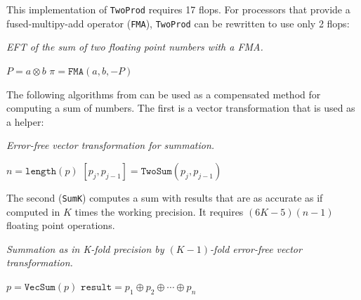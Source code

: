 \noindent This implementation of \texttt{TwoProd} requires 17 flops.
For processors that provide a fused-multipy-add operator (\texttt{FMA}),
\texttt{TwoProd} can be rewritten to use only 2 flops:

\begin{breakablealgorithm}
  \caption{\textit{EFT of the sum of two floating point numbers with a FMA.}}
  \label{alg:two-prod-fma}

  \begin{algorithmic}
      \State \(P = a \otimes b\)
      \State \(\pi = \mathtt{FMA}(a, b, -P)\)
    \EndFunction
  \end{algorithmic}
\end{breakablealgorithm}

\noindent The following algorithms from \cite{Ogita2005} can be used as a
compensated method for computing a sum of numbers. The first is a vector
transformation that is used as a helper:

\begin{breakablealgorithm}
  \caption{\textit{Error-free vector transformation for summation.}}
  \label{alg:vec-sum}

  \begin{algorithmic}
      \State \(n = \texttt{length}(p)\)
        \State \(\left[p_j, p_{j - 1}\right] = \mathtt{TwoSum}\left(
            p_j, p_{j - 1}\right)\)
      \EndFor
    \EndFunction
  \end{algorithmic}
\end{breakablealgorithm}

\noindent The second (\texttt{SumK}) computes a sum with results that are as
accurate as if computed in \(K\) times the working precision. It requires
\((6K - 5)(n - 1)\) floating point operations.

\begin{breakablealgorithm}
  \caption{\textit{Summation as in K-fold precision
      by \((K - 1)\)-fold error-free vector transformation.}}
  \label{alg:sum-k}

  \begin{algorithmic}
        \State \(p = \mathtt{VecSum}(p)\)
      \EndFor
      \State \(\mathtt{result} = p_1 \oplus p_2 \oplus \cdots \oplus p_n\)
    \EndFunction
  \end{algorithmic}
\end{breakablealgorithm}

